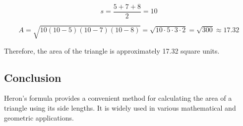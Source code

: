 \documentclass{article}
\begin{document}
\[
s = \frac{5+7+8}{2} = 10
\]

\[
A = \sqrt{10(10-5)(10-7)(10-8)} = \sqrt{10 \cdot 5 \cdot 3 \cdot 2} = \sqrt{300} \approx 17.32
\]

Therefore, the area of the triangle is approximately 17.32 square units.

\subsection{Conclusion}
Heron's formula provides a convenient method for calculating the area of a triangle using its side lengths. It is widely used in various mathematical and geometric applications.





\end{document}
